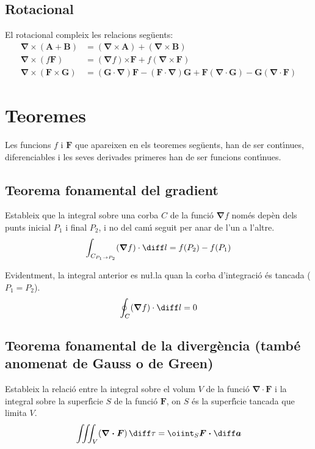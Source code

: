 \documentclass[catalan,a4paper,twoside,11pt]{article}
\begin{document}
\subsection{Rotacional}
El rotacional compleix les relacions seg\"{u}ents:
\begin{align}
    \boldsymbol{\nabla\times}(\boldsymbol{A}+\boldsymbol{B}) &= (\boldsymbol{\nabla\times A}) + (\boldsymbol{\nabla\times B})\\
    \boldsymbol{\nabla\times}(f\boldsymbol{F}) &=
    (\boldsymbol{\nabla}f)\boldsymbol{\times F} + f(\boldsymbol{\nabla\times F})\\
    \boldsymbol{\nabla\times}(\boldsymbol{F\times G}) &= (\boldsymbol{G\cdot\nabla})\boldsymbol{F} - (\boldsymbol{F\cdot\nabla})\boldsymbol{G} + \boldsymbol{F}(\boldsymbol{\nabla\cdot G}) - \boldsymbol{G}(\boldsymbol{\nabla\cdot F})
\end{align}


\section{Teoremes}

Les funcions $f$ i $\boldsymbol{F}$ que apareixen en els teoremes seg\"{u}ents, han de ser cont\'{\i}nues, diferenciables i les seves derivades primeres han de ser funcions cont\'{\i}nues.

\subsection{Teorema fonamental del gradient}
Estableix que la integral sobre una corba $C$ de la funci\'{o} $\boldsymbol{\nabla} f$ nom\'{e}s dep\`{e}n dels punts inicial $P_1$ i final $P_2$, i no del cam\'{\i} seguit per anar de l'un a l'altre.
\begin{equation}
    \int_{C_{P_1\rightarrow P_2}} (\boldsymbol{\nabla}f) \cdot \diff l = f(P_2)-f(P_1)
\end{equation}

Evidentment, la integral anterior es nu{\l.l}a quan la corba d'integraci\'{o} \'{e}s tancada ($P_1=P_2$).
\begin{equation}
    \oint_C (\boldsymbol{\nabla}f) \cdot \diff l = 0
\end{equation}

\subsection{Teorema fonamental de la diverg\`{e}ncia (tamb\'{e} anomenat de Gauss o de Green)}
Estableix la relaci\'{o} entre la integral sobre el volum $V$ de la funci\'{o} $\boldsymbol{\nabla\cdot F}$ i la integral sobre la superf\'{\i}cie $S$ de la funci\'{o} $\boldsymbol{F}$, on $S$ \'{e}s la superf\'{\i}cie tancada que limita $V$.
\begin{equation}
    \iiint_V(\boldsymbol{\nabla\cdot F})\,\diff \tau = \oiint_S\boldsymbol{F\cdot\diff a}
\end{equation}
\end{document}
